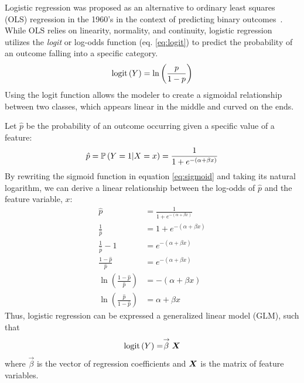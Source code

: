 Logistic regression was proposed as an alternative to ordinary least squares (OLS) regression in the 1960's in the context of predicting binary outcomes~\citep{An-Introduction-to-Logistic-Regression-Analysis-and-Reporting}. 
While OLS relies on linearity, normality, and continuity, logistic regression utilizes the \emph{logit} or log-odds function (eq. \ref{eq:logit}) to predict the probability of an outcome falling into a specific category. 
\begin{align}
    \text{logit}\left( Y \right) = \ln \left( \frac{p}{1-p} \right) \label{eq:logit}
\end{align}
Using the logit function allows the modeler to create a sigmoidal relationship between two classes, which appears linear in the middle and curved on the ends.

Let $\hat{p}$ be the probability of an outcome occurring given a specific value of a feature:
\begin{align}
    \hat{p} = \mathbb{P} \left( Y = 1 | X = x \right) = \frac{1}{1 + e^{-(\alpha + \beta x)}} \label{eq:sigmoid}
\end{align}
By rewriting the sigmoid function in equation \ref{eq:sigmoid} and taking its natural logarithm, we can derive a linear relationship between the log-odds of $\hat{p}$ and the feature variable, $x$:
\begin{align*}
    \hat{p} &= \frac{1}{1 + e^{-(\alpha + \beta x)}} \\
    \frac{1}{\hat{p}} &= 1 + e^{-(\alpha + \beta x)} \\
    \frac{1}{\hat{p}} - 1 &= e^{-(\alpha + \beta x)} \\
    \frac{1 - \hat{p}}{\hat{p}} &= e^{-(\alpha + \beta x)} \\
    \ln \left( \frac{1 - \hat{p}}{\hat{p}} \right) &= -(\alpha + \beta x) \\
    \ln \left( \frac{\hat{p}}{1 - \hat{p}} \right) &= \alpha + \beta x
\end{align*}
Thus, logistic regression can be expressed a generalized linear model (GLM), such that
\begin{align*}
    \text{logit}\left( Y \right) = \stackrel{\rightarrow}{\beta}\boldsymbol{X}
\end{align*}
where $\vec{\beta}$ is the vector of regression coefficients and $\boldsymbol{X}$ is the matrix of feature variables.


